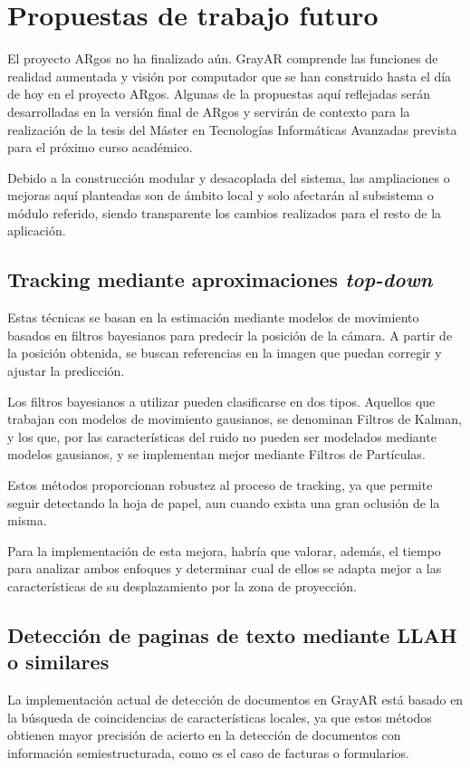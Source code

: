 \section{Propuestas de trabajo futuro}
El proyecto ARgos no ha finalizado aún. GrayAR comprende las funciones de realidad aumentada y visión por computador que se han construido hasta el día de hoy en el proyecto ARgos. Algunas de la propuestas aquí reflejadas serán desarrolladas en la versión final de ARgos y servirán de contexto para la realización de la tesis del Máster en Tecnologías Informáticas Avanzadas prevista para el próximo curso académico. 

Debido a la construcción modular y desacoplada del sistema, las ampliaciones o mejoras aquí planteadas son de ámbito local y solo afectarán al subsistema o módulo referido, siendo transparente los cambios realizados para el resto de la aplicación.
 
\subsection{Tracking mediante aproximaciones \emph{top-down}} 
Estas técnicas se basan en la estimación mediante modelos de movimiento basados en filtros bayesianos para predecir la posición de la cámara. A partir de la posición obtenida, se buscan referencias en la imagen que puedan corregir y ajustar la predicción.

Los filtros bayesianos a utilizar pueden clasificarse en dos tipos. Aquellos que trabajan con modelos de movimiento gausianos, se denominan Filtros de Kalman, y los que, por las características del ruido no pueden ser modelados mediante modelos gausianos, y se implementan mejor mediante Filtros de Partículas.

Estos métodos proporcionan robustez al proceso de tracking, ya que permite seguir detectando la hoja de papel, aun cuando exista una gran oclusión de la misma. 

Para la implementación de esta mejora, habría que valorar, además, el tiempo para analizar ambos enfoques y determinar cual de ellos se adapta mejor a las características de su desplazamiento por la zona de proyección. 

\subsection{Detección de paginas de texto mediante LLAH o similares}
La implementación actual de detección de documentos en GrayAR está basado en la búsqueda de coincidencias de características locales, ya que estos métodos obtienen mayor precisión de acierto en la detección de documentos con información semiestructurada, como es el caso de facturas o formularios. 

